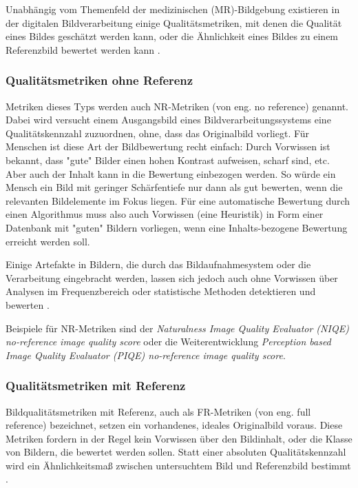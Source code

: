 Unabhängig vom Themenfeld der medizinischen (MR)-Bildgebung existieren in der digitalen Bildverarbeitung einige Qualitätsmetriken, mit denen die Qualität eines Bildes geschätzt werden kann, oder die Ähnlichkeit eines Bildes zu einem Referenzbild bewertet werden kann \cite{Wang2006}.

\subsubsection{Qualitätsmetriken ohne Referenz}
Metriken dieses Typs werden auch NR-Metriken (von eng. no reference) genannt. Dabei wird versucht einem Ausgangsbild eines Bildverarbeitungssystems eine Qualitätskennzahl zuzuordnen, ohne, dass das Originalbild vorliegt. Für Menschen ist diese Art der Bildbewertung recht einfach: Durch Vorwissen ist bekannt, dass "gute" Bilder einen hohen Kontrast aufweisen, scharf sind, etc. Aber auch der Inhalt kann in die Bewertung einbezogen werden. So würde ein Mensch ein Bild mit geringer Schärfentiefe nur dann als gut bewerten, wenn die relevanten Bildelemente im Fokus liegen. Für eine automatische Bewertung durch einen Algorithmus muss also auch Vorwissen (eine Heuristik) in Form einer Datenbank mit "guten" Bildern vorliegen, wenn eine Inhalts-bezogene Bewertung erreicht werden soll.

Einige Artefakte in Bildern, die durch das Bildaufnahmesystem oder die Verarbeitung eingebracht werden, lassen sich jedoch auch ohne Vorwissen über Analysen im Frequenzbereich oder statistische Methoden detektieren und bewerten \cite[S.~86]{Wang2006}.

Beispiele für NR-Metriken sind der \textit{Naturalness Image Quality Evaluator (NIQE) no-reference image quality score}\cite{Mittal2013} oder die Weiterentwicklung \textit{Perception based Image Quality Evaluator (PIQE) no-reference image quality score}\cite{Venkatanath2015}.

\subsubsection{Qualitätsmetriken mit Referenz}
Bildqualitätsmetriken mit Referenz, auch als FR-Metriken (von eng. full reference) bezeichnet, setzen ein vorhandenes, ideales Originalbild voraus. Diese Metriken fordern in der Regel kein Vorwissen über den Bildinhalt, oder die Klasse von Bildern, die bewertet werden sollen. Statt einer absoluten Qualitätskennzahl wird ein Ähnlichkeitsmaß zwischen untersuchtem Bild und Referenzbild bestimmt \cite[S.~43]{Wang2006}.

